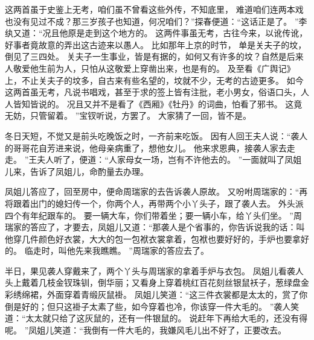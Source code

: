 这两首虽于史鉴上无考，咱们虽不曾看这些外传，不知底里，
难道咱们连两本戏也没有见过不成？那三岁孩子也知道，何况咱们？”探春便道：“这话正是了。
”李纨又道：“况且他原是走到这个地方的。
这两件事虽无考，古往今来，以讹传讹，好事者竟故意的弄出这古迹来以愚人。
比如那年上京的时节，
单是关夫子的坟，倒见了三四处。
关夫子一生事业，皆是有据的，如何又有许多的坟？自然是后来人敬爱他生前为人，只怕从这敬爱上穿凿出来，也是有的。
及至看《广舆记》上，不止关夫子的坟多，自古来有些名望的，坟就不少，无考的古迹更多。
如今这两首虽无考，凡说书唱戏，甚至于求的签上皆有注批，老小男女，俗语口头，人人皆知皆说的。
况且又并不是看了《西厢》《牡丹》的词曲，怕看了邪书。
这竟无妨，只管留着。
”宝钗听说，方罢了。
大家猜了一回，皆不是。
\par
冬日天短，不觉又是前头吃晚饭之时，一齐前来吃饭。
因有人回王夫人说：“袭人的哥哥花自芳进来说，他母亲病重了，想他女儿。
他来求恩典，接袭人家去走走。
”王夫人听了，便道：“人家母女一场，岂有不许他去的。
”一面就叫了凤姐儿来，告诉了凤姐儿，命酌量去办理。
\par
凤姐儿答应了，回至房中，便命周瑞家的去告诉袭人原故。
又吩咐周瑞家的：“再将跟着出门的媳妇传一个，你两个人，再带两个小丫头子，跟了袭人去。
外头派四个有年纪跟车的。
要一辆大车，你们带着坐；要一辆小车，给丫头们坐。
”周瑞家的答应了，才要去，凤姐儿又道：“那袭人是个省事的，你告诉说我的话：叫他穿几件颜色好衣裳，大大的包一包袱衣裳拿着，包袱也要好好的，手炉也要拿好的。
临走时，叫他先来我瞧瞧。
”周瑞家的答应去了。
\par
半日，果见袭人穿戴来了，两个丫头与周瑞家的拿着手炉与衣包。
凤姐儿看袭人头上戴着几枝金钗珠钏，倒华丽；又看身上穿着桃红百花刻丝银鼠袄子，葱绿盘金彩绣绵裙，外面穿着青缎灰鼠褂。
凤姐儿笑道：“这三件衣裳都是太太的，赏了你倒是好的；但只这褂子太素了些，如今穿着也冷，你该穿一件大毛的。
”袭人笑道：“太太就只给了这灰鼠的，还有一件银鼠的。
说赶年下再给大毛的，还没有得呢。
”凤姐儿笑道：“我倒有一件大毛的，我嫌风毛儿出不好了，正要改去。
